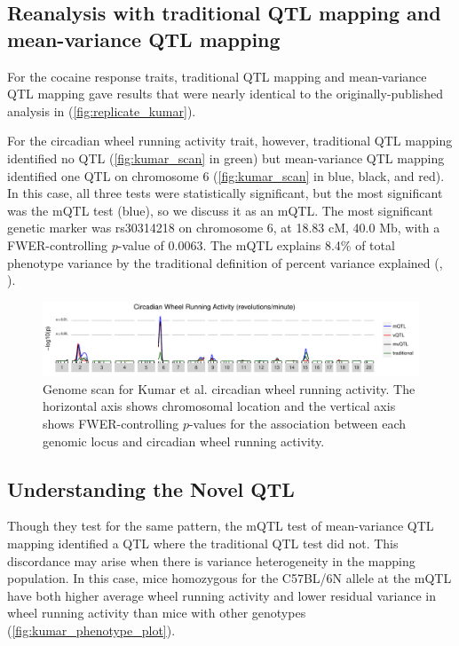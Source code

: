     \subsection{Reanalysis with traditional QTL mapping and mean-variance QTL mapping}

    For the cocaine response traits, traditional QTL mapping and mean-variance QTL mapping
    gave results that were nearly identical to the originally-published analysis in \citet{Kumar2013} (\autoref{fig:replicate_kumar}). 

    For the circadian wheel running activity trait, however, traditional QTL mapping identified no QTL (\autoref{fig:kumar_scan} in green) but mean-variance QTL mapping identified one QTL on chromosome 6 (\autoref{fig:kumar_scan} in blue, black, and red).
    In this case, all three tests were statistically significant, but the most significant was the mQTL test (blue), so we discuss it as an mQTL.
    The most significant genetic marker was rs30314218 on chromosome 6, at 18.83 cM, 40.0 Mb, with a FWER-controlling $p$-value of 0.0063.
    The mQTL explains 8.4\% of total phenotype variance by the traditional definition of percent variance explained (\eg, \citealt{Broman2009}).

    \begin{figure}
      \includegraphics[width=\linewidth]{images/Kumar_avg_counts_scan.pdf}
      \caption[
      Genome scan for Kumar et al. circadian wheel running activity.
      ]
      {
        Genome scan for Kumar et al. circadian wheel running activity.
        The horizontal axis shows chromosomal location and the vertical axis shows FWER-controlling $p$-values for the association between each genomic locus and circadian wheel running activity.
      }
      \label{fig:kumar_scan}
    \end{figure}


    \subsection{Understanding the Novel QTL}
    Though they test for the same pattern, the mQTL test of mean-variance QTL mapping identified a QTL where the traditional QTL test did not.
    This discordance may arise when there is variance heterogeneity in the mapping population.
    In this case, mice homozygous for the C57BL/6N allele at the mQTL have both higher average wheel running activity and lower residual variance in wheel running activity than mice with other genotypes (\autoref{fig:kumar_phenotype_plot}).

